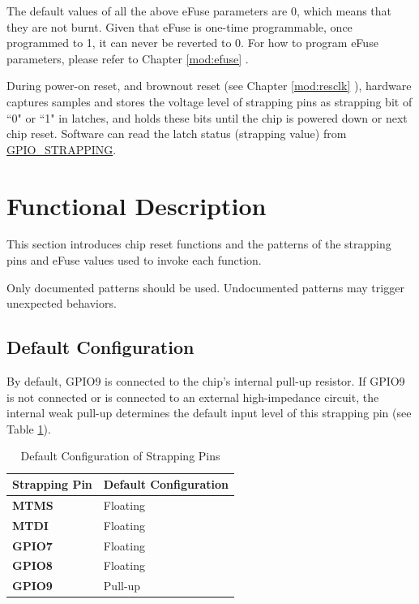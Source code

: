 \documentclass[main\_\_EN.tex]{subfiles}
\begin{document}
The default values of all the above eFuse parameters are 0, which means that they are not burnt. Given that eFuse is one-time programmable, once programmed to 1, it can never be reverted to 0. For how to program eFuse parameters, please refer to Chapter \ref{mod:efuse} \textit{}.

During power-on reset, and brownout reset (see Chapter \ref{mod:resclk} \textit{}), hardware captures samples and stores the voltage level of strapping pins as strapping bit of ``0" or ``1" in latches, and holds these bits until the chip is powered down or next chip reset. Software can read the latch status (strapping value) from \hyperref[fielddesc:GPIOSTRAPPING]{GPIO\_STRAPPING}.


\section{Functional Description}

This section introduces chip reset functions and the patterns of the strapping pins and eFuse values used to invoke each function.

\begin{importantlisting}
Only documented patterns should be used. Undocumented patterns may trigger unexpected behaviors.
\end{importantlisting}

\subsection{Default Configuration}
By default, GPIO9 is connected to the chip's internal pull-up resistor. If GPIO9 is not connected or is connected to an external high-impedance circuit, the internal weak pull-up determines the default input level of this strapping pin (see Table \ref{tab:bootctrl-default-config-strapping-pins}).

\begin{longtable}[c]{|p{2.5cm}|p{3.5cm}|}
\caption{Default Configuration of Strapping Pins}
\label{tab:bootctrl-default-config-strapping-pins} \\
    \hline
    \rowcolor{lightgray}
  \textbf{Strapping Pin} & \textbf{Default Configuration} \\ \hline
  \textbf{MTMS} & Floating \\ \hline
  \textbf{MTDI} & Floating \\ \hline
  \textbf{GPIO7}  & Floating \\ \hline
  \textbf{GPIO8} & Floating \\ \hline
  \textbf{GPIO9} & Pull-up \\ \hline
\end{longtable}
\end{document}
